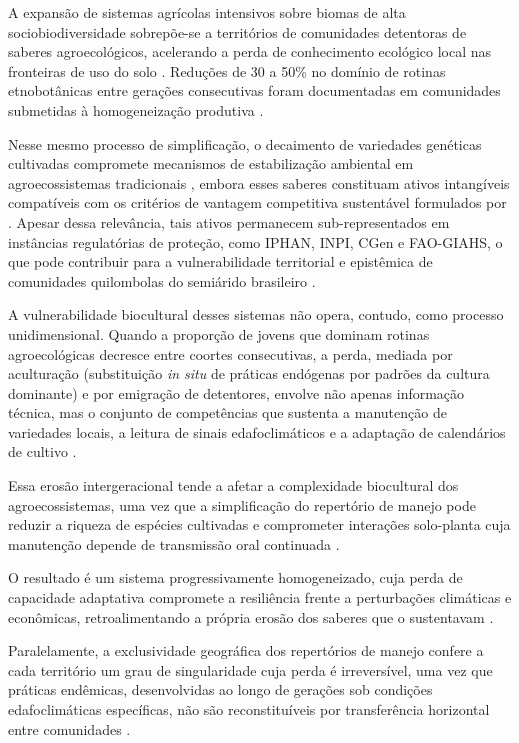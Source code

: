 A expansão de sistemas agrícolas intensivos sobre biomas de alta sociobiodiversidade sobrepõe-se a territórios de comunidades detentoras de saberes agroecológicos, acelerando a perda de conhecimento ecológico local nas fronteiras de uso do solo \cite{Altieri2004}. Reduções de 30 a 50\% no domínio de rotinas etnobotânicas entre gerações consecutivas foram documentadas em comunidades submetidas à homogeneização produtiva \cite{ReyesGarcia2013}. 

Nesse mesmo processo de simplificação, o decaimento de variedades genéticas cultivadas compromete mecanismos de estabilização ambiental em agroecossistemas tradicionais \cite{Jarvis2008}, embora esses saberes constituam ativos intangíveis compatíveis com os critérios de vantagem competitiva sustentável formulados por . Apesar dessa relevância, tais ativos permanecem sub-representados em instâncias regulatórias de proteção, como IPHAN, INPI, CGen e FAO-GIAHS, o que pode contribuir para a vulnerabilidade territorial e epistêmica de comunidades quilombolas do semiárido brasileiro \cite{Santilli2009,Cunha2009,Goncalves2022}.

A vulnerabilidade biocultural desses sistemas não opera, contudo, como processo unidimensional. Quando a proporção de jovens que dominam rotinas agroecológicas decresce entre coortes consecutivas, a perda, mediada por aculturação (substituição \textit{in situ} de práticas endógenas por padrões da cultura dominante) e por emigração de detentores, envolve não apenas informação técnica, mas o conjunto de competências que sustenta a manutenção de variedades locais, a leitura de sinais edafoclimáticos e a adaptação de calendários de cultivo \cite{ReyesGarcia2013,GomezBaggethun2013}.

Essa erosão intergeracional tende a afetar a complexidade biocultural dos agroecossistemas, uma vez que a simplificação do repertório de manejo pode reduzir a riqueza de espécies cultivadas e comprometer interações solo-planta cuja manutenção depende de transmissão oral continuada \cite{Brush2004,Jarvis2008,Bastos2022}. 

O resultado é um sistema progressivamente homogeneizado, cuja perda de capacidade adaptativa compromete a resiliência frente a perturbações climáticas e econômicas, retroalimentando a própria erosão dos saberes que o sustentavam \cite{Tran2025,Aniah2019}.

Paralelamente, a exclusividade geográfica dos repertórios de manejo confere a cada território um grau de singularidade cuja perda é irreversível, uma vez que práticas endêmicas, desenvolvidas ao longo de gerações sob condições edafoclimáticas específicas, não são reconstituíveis por transferência horizontal entre comunidades \cite{Laborde2023,Ens2016}. 

